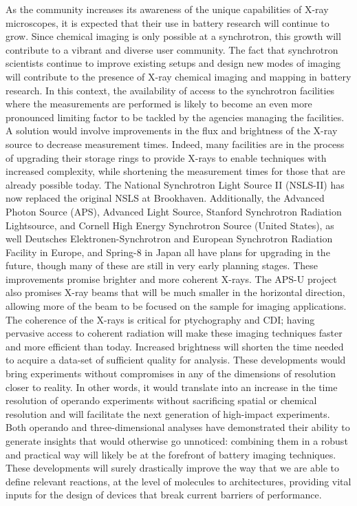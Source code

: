 \documentclass[journal=cmatex,manuscript=perspective]{achemso}
\begin{document}
As the community increases its awareness of the unique capabilities of
X-ray microscopes, it is expected that their use in battery research
will continue to grow. Since chemical imaging is only possible at a
synchrotron, this growth will contribute to a vibrant and diverse user
community. The fact that synchrotron scientists continue to improve
existing setups and design new modes of imaging will contribute to the
presence of X-ray chemical imaging and mapping in battery research. In
this context, the availability of access to the synchrotron facilities
where the measurements are performed is likely to become an even more
pronounced limiting factor to be tackled by the agencies managing the
facilities. A solution would involve improvements in the flux and
brightness of the X-ray source to decrease measurement times. Indeed,
many facilities are in the process of upgrading their storage rings to
provide X-rays to enable techniques with increased complexity, while
shortening the measurement times for those that are already possible
today. The National Synchrotron Light Source II (NSLS-II) has now
replaced the original NSLS at Brookhaven. Additionally, the Advanced
Photon Source (APS), Advanced Light Source, Stanford Synchrotron
Radiation Lightsource, and Cornell High Energy Synchrotron Source
(United States), as well Deutsches Elektronen-Synchrotron and European
Synchrotron Radiation Facility in Europe, and Spring-8 in Japan all
have plans for upgrading in the future, though many of these are still
in very early planning stages. These improvements promise brighter and
more coherent X-rays. The APS-U project also promises X-ray beams that
will be much smaller in the horizontal direction, allowing more of the
beam to be focused on the sample for imaging applications. The
coherence of the X-rays is critical for ptychography and CDI; having
pervasive access to coherent radiation will make these imaging
techniques faster and more efficient than today. Increased brightness
will shorten the time needed to acquire a data-set of sufficient
quality for analysis. These developments would bring experiments
without compromises in any of the dimensions of resolution closer to
reality. In other words, it would translate into an increase in the
time resolution of operando experiments without sacrificing spatial or
chemical resolution and will facilitate the next generation of
high-impact experiments. Both operando and three-dimensional analyses
have demonstrated their ability to generate insights that would
otherwise go unnoticed: combining them in a robust and practical way
will likely be at the forefront of battery imaging techniques. These
developments will surely drastically improve the way that we are able
to define relevant reactions, at the level of molecules to
architectures, providing vital inputs for the design of devices that
break current barriers of performance.
\end{document}
